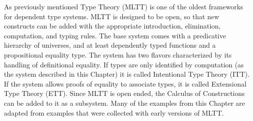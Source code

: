 As previously mentioned \MartinL{} Type Theory (\ac{MLTT})\cite{Martin-Lof-1972} is one of the oldest frameworks for dependent type systems.
\ac{MLTT} is designed to be open, so that new constructs can be added with the appropriate introduction, elimination, computation, and typing rules.
The base system comes with a predicative hierarchy of universes, and at least dependently typed functions and a propositional equality type.
The system has two flavors characterized by its handling of definitional equality.
If types are only identified by computation (as the system described in this Chapter) it is called Intentional Type Theory (\ac{ITT}).
If the system allows proofs of equality to associate types, it is called Extensional Type Theory (\ac{ETT}).
Since \ac{MLTT} is open ended, the Calculus of Constructions can be added to it as a subsystem\cite{aspinall2004dependent,hofmann1997extensional}.
Many of the examples from this Chapter are adapted from examples that were collected with early versions of \ac{MLTT}\cite{Martin-Lof-1971}.
 
 
 
